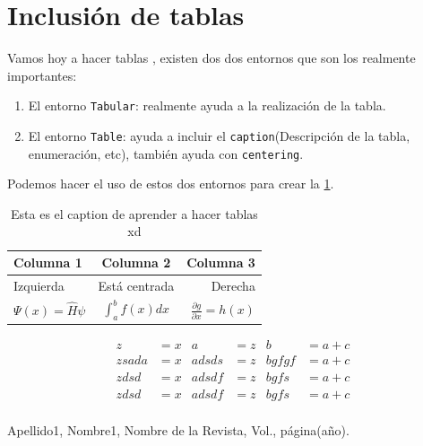 \documentclass[onecolumn]{article} %
\begin{document}
\newpage %

\section{Inclusión de tablas} %
Vamos hoy a hacer tablas \cite{normal}, existen dos dos entornos que son los realmente importantes:
\begin{enumerate}
	\item El entorno \verb+Tabular+: realmente ayuda a la realización de la tabla. %
	\item El entorno \verb+Table+: ayuda a incluir el \verb+caption+(Descripción de la tabla, enumeración, etc), 			también ayuda con \verb+centering+. %
\end{enumerate}
Podemos hacer el uso de estos dos entornos para crear la \ref{Tabla_primera}.
	\begin{table}[h!] %
	\centering
		\begin{tabular}{|l|c|r|}%
		\hline
		Columna 1 & Columna 2 & Columna 3 \\ \hline%
		Izquierda & Está centrada & Derecha\\
		\hline
		$\Psi(x)=\hat{H}\psi$ & $\int_a^b f(x)dx$ & $\frac{\partial g}{\partial x}= h(x)$ \\
		\hline
		\end{tabular}
	\caption{\label{Tabla_primera} Esta es el caption de aprender a hacer tablas xd}
	\end{table}
\begin{align*}
z&= x  & a&=z  & b&=a+c  \\ 
zsada&= x  & adsds&=z  & bgfgf&=a+c\\
zdsd&= x  & adsdf&=z  & bgfs&=a+c  \\
zdsd&= x  & adsdf&=z  & bgfs&=a+c\\
\end{align*}


	
\begin{thebibliography}{99} %
 Apellido1, Nombre1, Nombre de la Revista, Vol., página(año). 

\end{thebibliography}
\end{document}

